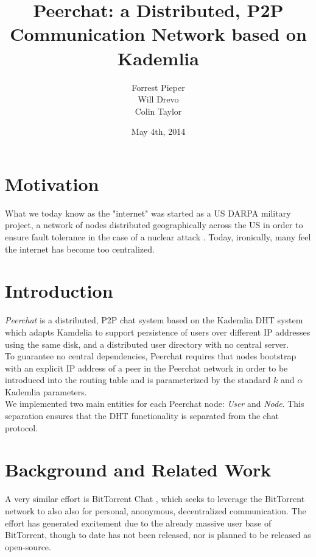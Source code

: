 \documentclass{article}
\title{Peerchat: a Distributed, P2P Communication Network based on Kademlia}
\author{
  Forrest Pieper\\
  Will Drevo\\
  Colin Taylor
}
\date{May 4th, 2014}
\begin{document}
\maketitle

\section{Motivation}
\label{Motivation}

What we today know as the "internet" was started as a US DARPA military project, a network of nodes distributed geographically across the US in order to ensure fault tolerance in the case of a nuclear attack \cite{?}. Today, ironically, many feel the internet has become too centralized. \\

\section{Introduction}

\textit{Peerchat} is a distributed, P2P chat system based on the Kademlia DHT \cite{Maymounkov02} system which adapts Kamdelia to support persistence of users over different IP addresses using the same disk, and a distributed user directory with no central server. \\

To guarantee no central dependencies, Peerchat requires that nodes bootstrap with an explicit IP address of a peer in the Peerchat network in order to be introduced into the routing table and is parameterized by the standard $k$ and $\alpha$ Kademlia parameters. \\

We implemented two main entities for each Peerchat node: \textit{User} and \textit{Node}. This separation ensures that the DHT functionality is separated from the chat protocol. 

\section{Background and Related Work}

A very similar effort is BitTorrent Chat \cite{Goldoor13}, which seeks to leverage the BitTorrent network to also also for personal, anonymous, decentralized communication. The effort has generated excitement due to the already massive user base of BitTorrent, though to date has not been released, nor is planned to be released as open-source. \\
\end{document}
